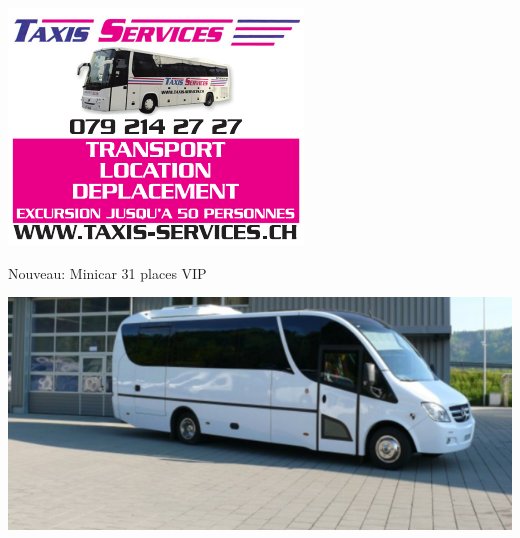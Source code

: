 {\centering
\includegraphics[width=.95\textwidth]{fig/taxi.pdf}
\par
\vspace*{20mm}

{\Huge
Nouveau: Minicar 31 places VIP}
\par
\includegraphics[width=.8\textwidth]{fig/bus.png}
\par
}
\clearpage
\thispagestyle{empty}%
